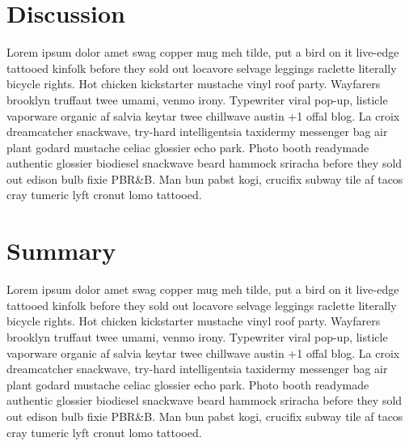 \documentclass[apj, revtex4]{emulateapj}
\begin{document}
\section{Discussion}\label{sec:discussion}

Lorem ipsum dolor amet swag copper mug meh tilde, put a bird on it live-edge tattooed kinfolk before they sold out locavore selvage leggings raclette literally bicycle rights. Hot chicken kickstarter mustache vinyl roof party. Wayfarers brooklyn truffaut twee umami, venmo irony. Typewriter viral pop-up, listicle vaporware organic af salvia keytar twee chillwave austin +1 offal blog. La croix dreamcatcher snackwave, try-hard intelligentsia taxidermy messenger bag air plant godard mustache celiac glossier echo park. Photo booth readymade authentic glossier biodiesel snackwave beard hammock sriracha before they sold out edison bulb fixie PBR\&B. Man bun pabst kogi, crucifix subway tile af tacos cray tumeric lyft cronut lomo tattooed.

\section{Summary}\label{sec:summary}

Lorem ipsum dolor amet swag copper mug meh tilde, put a bird on it live-edge tattooed kinfolk before they sold out locavore selvage leggings raclette literally bicycle rights. Hot chicken kickstarter mustache vinyl roof party. Wayfarers brooklyn truffaut twee umami, venmo irony. Typewriter viral pop-up, listicle vaporware organic af salvia keytar twee chillwave austin +1 offal blog. La croix dreamcatcher snackwave, try-hard intelligentsia taxidermy messenger bag air plant godard mustache celiac glossier echo park. Photo booth readymade authentic glossier biodiesel snackwave beard hammock sriracha before they sold out edison bulb fixie PBR\&B. Man bun pabst kogi, crucifix subway tile af tacos cray tumeric lyft cronut lomo tattooed.
\end{document}
